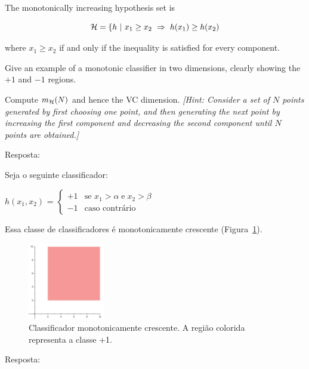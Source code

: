 \begin{enunciado}{15}
    The monotonically increasing hypothesis set is
    
    $$ \mathcal{H} = \{ h~|~ x_1 \ge x_2 ~ \Rightarrow ~ h(x_1) \ge h(x_2) $$
    
    where $x_1 \ge x_2$ if and only if the inequality is satisfied for every component.
    
     Give an example of a monotonic classifier in two dimensions, clearly showing the $+1$ and $-1$ regions.

    	

    
     Compute $m_{\mathcal{H}}(N)$ and hence the VC dimension. \textit{[Hint: Consider a set of $N$ points generated by first choosing one point, and then generating the next point by increasing the first component and decreasing the second component until $N$ points are obtained.]}

\end{enunciado}
     Resposta:
    
    Seja o seguinte classificador:

   $h(x_1, x_2)$ = 
    $
    \begin{cases}
	    +1 &\mbox{se } x_1 > \alpha \; \text{e} \; x_2 > \beta  \\ 
	    -1 &\mbox{caso contrário }
    \end{cases}
    $

    Essa classe de classificadores é monotonicamente crescente (Figura~\ref{fig:ex15a}).

    \begin{figure}[h]
	    \includegraphics[width=0.3\textwidth]{ex15a}
	    \caption{Classificador monotonicamente crescente. A região colorida representa a classe +1.}
	    \label{fig:ex15a}
    \end{figure}
    
     Resposta:

